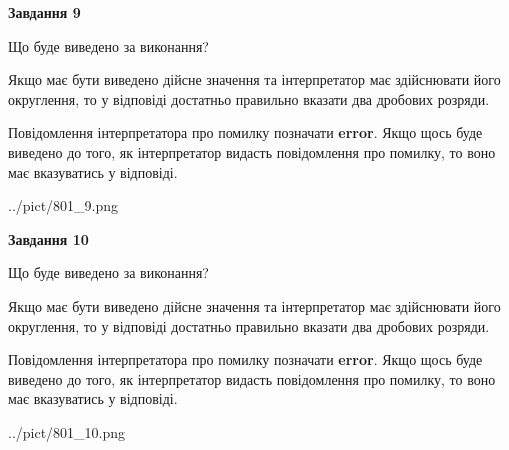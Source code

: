 \documentclass[12pt, ukrainian]{article}
\begin{document}
{\begin {Large}
{\begin {center}\textbf{Завдання 9}\end {center}}\par
Що буде виведено за виконання? \par

Якщо має бути виведено дійсне значення та інтерпретатор має здійснювати його округлення, 
то у відповіді достатньо правильно вказати два дробових розряди.

Повідомлення інтерпретатора про помилку позначати \textbf{error}.
Якщо щось буде виведено до того, як інтерпретатор видасть повідомлення про помилку, 
то воно має вказуватись у відповіді. \par

\begin{center}
	{../pict/801_9.png}
\end{center}
\newpage

{\begin {center}\textbf{Завдання 10}\end {center}}\par
Що буде виведено за виконання? \par

Якщо має бути виведено дійсне значення та інтерпретатор має здійснювати його округлення, 
то у відповіді достатньо правильно вказати два дробових розряди.

Повідомлення інтерпретатора про помилку позначати \textbf{error}.
Якщо щось буде виведено до того, як інтерпретатор видасть повідомлення про помилку, 
то воно має вказуватись у відповіді. \par

\begin{center}
	{../pict/801_10.png}
\end{center}
\newpage

\end {Large}}
\end{document}
